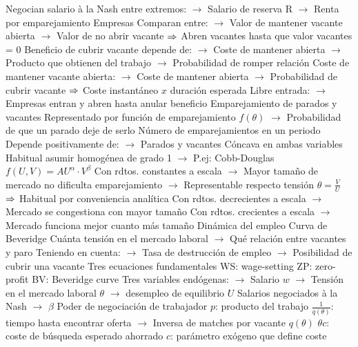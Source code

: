\documentclass{nuevotema}
\begin{document}
\begin{esquemal}
				\4[] Negocian salario à la Nash entre extremos:
				\4[] $\to$ Salario de reserva R
				\4[] $\to$ Renta por emparejamiento
				\4 Empresas
				\4[] Comparan entre:
				\4[] $\to$ Valor de mantener vacante abierta
				\4[] $\to$ Valor de no abrir vacante
				\4[] $\Rightarrow$ Abren vacantes hasta que valor vacantes = 0
				\4[] Beneficio de cubrir vacante depende de:
				\4[] $\to$ Coste de mantener abierta
				\4[] $\to$ Producto que obtienen del trabajo
				\4[] $\to$ Probabilidad de romper relación
				\4[] Coste de mantener vacante abierta:
				\4[] $\to$ Coste de mantener abierta
				\4[] $\to$ Probabilidad de cubrir vacante
				\4[] $\Rightarrow$ Coste instantáneo $x$ duración esperada
				\4[] Libre entrada:
				\4[] $\to$ Empresas entran y abren hasta anular beneficio
				\4 Emparejamiento de parados y vacantes
				\4[] Representado por función de emparejamiento $f(\theta)$
				\4[] $\to$ Probabilidad de que un parado deje de serlo
				\4[] Número de emparejamientos en un periodo
				\4[] Depende positivamente de:
				\4[] $\to$ Parados y vacantes
				\4[] Cóncava en ambas variables
				\4[] Habitual asumir homogénea de grado 1
				\4[] $\to$ P.ej: Cobb-Douglas
				\4[] $f(U,V) = A U^\alpha \cdot V^\beta$
				\4[] Con rdtos. constantes a escala
				\4[] $\to$ Mayor tamaño de mercado no dificulta emparejamiento
				\4[] $\to$ Representable respecto tensión $\theta=\frac{V}{U}$
				\4[] $\Rightarrow$ Habitual por conveniencia analítica
				\4[] Con rdtos. decrecientes a escala
				\4[] $\to$ Mercado se congestiona con mayor tamaño
				\4[] Con rdtos. crecientes a escala
				\4[] $\to$ Mercado funciona mejor cuanto más tamaño
				\4 Dinámica del empleo
				\4[] Curva de Beveridge
				\4[] Cuánta tensión en el mercado laboral
				\4[] $\to$ Qué relación entre vacantes y paro
				\4[] Teniendo en cuenta:
				\4[] $\to$ Tasa de destrucción de empleo
				\4[] $\to$ Posibilidad de cubrir una vacante
				\4 Tres ecuaciones fundamentales
				\4[] WS: wage-setting
				\4[] ZP: zero-profit
				\4[] BV: Beveridge curve
				\4 Tres variables endógenas:
				\4[] $\to$ Salario $w$
				\4[] $\to$ Tensión en el mercado laboral $\theta$
				\4[] $\to$ desempleo de equilibrio $U$
				\4[WS] Salarios negociados à la Nash
				\4[] 
				\4[] $\to$ $\beta$ Poder de negociación de trabajador
				\4[] $p$: producto del trabajo
				\4[] $\frac{1}{q(\theta)}$: tiempo hasta encontrar oferta
				\4[] $\to$ Inversa de matches por vacante $q(\theta)$
				\4[] $\theta c$: coste de búsqueda esperado ahorrado
				\4[] $c$: parámetro exógeno que define coste

\end{esquemal}
\end{document}
